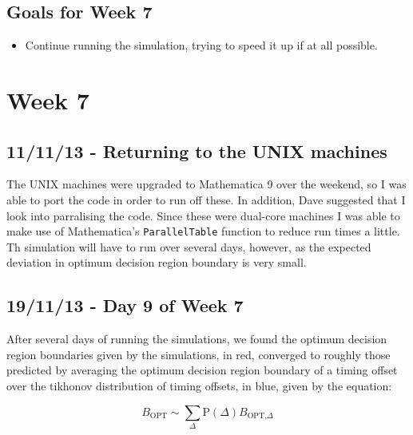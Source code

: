 \subsection{Goals for Week 7}

\begin{itemize}
\itemsep1pt\parskip0pt
\item
  Continue running the simulation, trying to speed it up if at all
  possible.
\end{itemize}

\section{Week 7}

\subsection{11/11/13 - Returning to the UNIX machines}

The UNIX machines were upgraded to Mathematica 9 over the weekend, so I
was able to port the code in order to run off these. In addition, Dave
suggested that I look into parralising the code. Since these were
dual-core machines I was able to make use of Mathematica's
\texttt{ParallelTable} function to reduce run times a little. Th
simulation will have to run over several days, however, as the expected
deviation in optimum decision region boundary is very small.

\subsection{19/11/13 - Day 9 of Week 7}

After several days of running the simulations, we found the optimum
decision region boundaries given by the simulations, in red, converged
to roughly those predicted by averaging the optimum decision region
boundary of a timing offset over the tikhonov distribution of timing
offsets, in blue, given by the equation:

\[
B_{\text{OPT}} \sim \sum_{\Delta} \text{P}(\Delta) B_{\text{OPT,}\Delta}
\]

